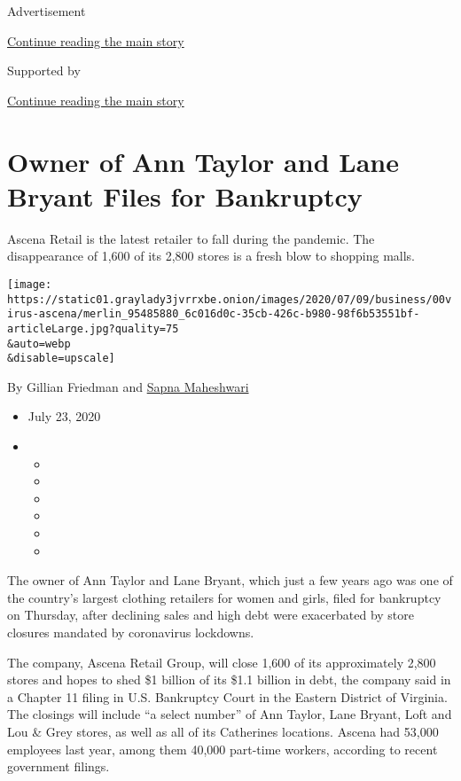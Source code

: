 Advertisement

\protect\hyperlink{after-top}{Continue reading the main story}

Supported by

\protect\hyperlink{after-sponsor}{Continue reading the main story}

\hypertarget{owner-of-ann-taylor-and-lane-bryant-files-for-bankruptcy}{%
\section{Owner of Ann Taylor and Lane Bryant Files for
Bankruptcy}\label{owner-of-ann-taylor-and-lane-bryant-files-for-bankruptcy}}

Ascena Retail is the latest retailer to fall during the pandemic. The
disappearance of 1,600 of its 2,800 stores is a fresh blow to shopping
malls.

\texttt{[image: https://static01.graylady3jvrrxbe.onion/images/2020/07/09/business/00virus-ascena/merlin\_95485880\_6c016d0c-35cb-426c-b980-98f6b53551bf-articleLarge.jpg?quality=75\\\&auto=webp\\\&disable=upscale]}

By Gillian Friedman and
\href{https://www.nytimes3xbfgragh.onion/by/sapna-maheshwari}{Sapna
Maheshwari}

\begin{itemize}
\item
  July 23, 2020
\item
  \begin{itemize}
  \item
  \item
  \item
  \item
  \item
  \item
  \end{itemize}
\end{itemize}

The owner of Ann Taylor and Lane Bryant, which just a few years ago was
one of the country's largest clothing retailers for women and girls,
filed for bankruptcy on Thursday, after declining sales and high debt
were exacerbated by store closures mandated by coronavirus lockdowns.

The company, Ascena Retail Group, will close 1,600 of its approximately
2,800 stores and hopes to shed \$1 billion of its \$1.1 billion in debt,
the company said in a Chapter 11 filing in U.S. Bankruptcy Court in the
Eastern District of Virginia. The closings will include ``a select
number'' of Ann Taylor, Lane Bryant, Loft and Lou \& Grey stores, as
well as all of its Catherines locations. Ascena had 53,000 employees
last year, among them 40,000 part-time workers, according to recent
government filings.

